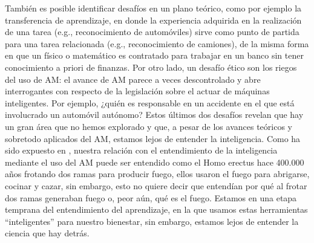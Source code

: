 También es posible identificar desafíos en un plano teórico, como por ejemplo la transferencia de aprendizaje, en donde la experiencia adquirida en la realización de una tarea (e.g., reconocimiento de automóviles) sirve como punto de partida para una tarea relacionada (e.g., reconocimiento de camiones), de la misma forma en que un físico o matemático es contratado para trabajar en un banco sin tener conocimiento a priori de finanzas. Por otro lado, un desafío ético son los riegos del uso de AM: el avance de AM parece a veces descontrolado y abre interrogantes con respecto de la legislación sobre el actuar de máquinas inteligentes. Por ejemplo, ¿quién es responsable en un accidente en el que está involucrado un automóvil autónomo? Estos últimos dos desafíos revelan que hay un gran área que no hemos explorado y que, a pesar de los avances teóricos y sobretodo aplicados del AM, estamos lejos de entender la inteligencia. Como ha sido expuesto en \cite{gal_2016}, nuestra relación con el entendimiento de la inteligencia mediante el uso del AM puede ser entendido como el Homo erectus hace 400.000 años frotando dos ramas para producir fuego, ellos usaron el fuego para abrigarse, cocinar y cazar, sin embargo, esto no quiere decir que entendían por qué al frotar dos ramas generaban fuego o, peor aún, qué es el fuego. Estamos en una etapa temprana del entendimiento del aprendizaje, en la que usamos estas herramientas “inteligentes” para nuestro bienestar, sin embargo, estamos lejos de entender la ciencia que hay detrás. 
    
